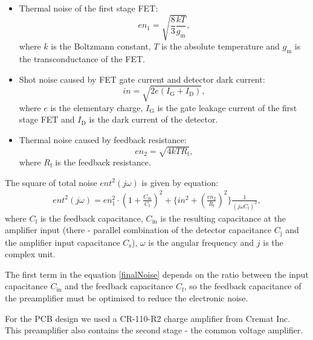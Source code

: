 \begin{itemize}
\item Thermal noise of the first stage FET:
\begin{equation}
en_1 = \sqrt{\frac{8}{3}\frac{kT}{g_{\textrm{m}}}},
\end{equation}
where $k$ is the Boltzmann constant, $T$ is the absolute temperature and $g_{\textrm{m}}$ is the transconductance of the FET.
\item Shot noise caused by FET gate current and detector dark current:
\begin{equation}
in = \sqrt{2e(I_{\textrm{G}} + I_{\textrm{D}})},
\end{equation}
where $e$ is the elementary charge, $I_{\textrm{G}}$ is the gate leakage current of the first stage FET and $I_{\textrm{D}}$ is the dark current of the detector.
\item Thermal noise caused by feedback resistance: 
\begin{equation}
en_2 = \sqrt{4kTR_{\textrm{f}}},
\end{equation}
where $R_{\textrm{f}}$ is the feedback resistance.
\end{itemize}
The square of total noise $ent^2(j \omega)$ is given by equation:
\begin{equation}
\begin{aligned}
ent^2(j \omega) = en_1^2 \cdot (1+\frac{C_{\textrm{in}}}{C_{\textrm{f}}})^2 + \{in^2 + (\frac{en_2}{R_{\textrm{f}}})^2 \}\frac{1}{(j \omega C_{\textrm{f}})^2},
\end{aligned}
\label{finalNoise}
\end{equation}
where $C_{\textrm{f}}$ is the feedback capacitance, $C_{\textrm{in}}$ is the resulting capacitance at the amplifier input (there - parallel combination of the detector capacitance $C_{\textrm{j}}$ and the amplifier input capacitance $C_{\textrm{s}}$), $\omega$ is the angular frequency and $j$ is the complex unit.
\par
The first term in the equation \ref{finalNoise} depends on the ratio between the input capacitance $C_{\textrm{in}}$ and the feedback capacitance $C_{\textrm{f}}$, so the feedback capacitance of the preamplifier must be optimised to reduce the electronic noise.
\par
For the PCB design we used a CR-110-R2 charge amplifier from Cremat Inc. This preamplifier also contains the second stage - the common voltage amplifier.
